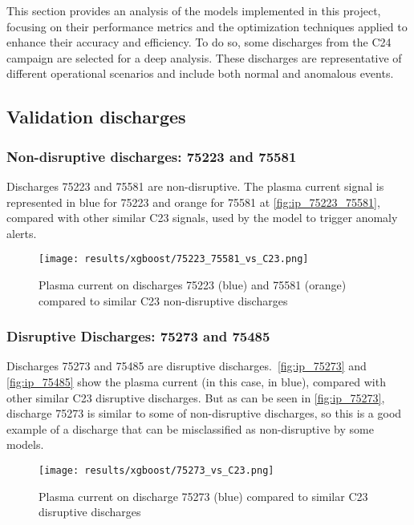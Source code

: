 This section provides an analysis of the models implemented in this project, focusing on their performance metrics and the optimization techniques applied to enhance their accuracy and efficiency. To do so, some discharges from the C24 campaign are selected for a deep analysis. These discharges are representative of different operational scenarios and include both normal and anomalous events.

\subsection{Validation discharges}

\subsubsection{Non-disruptive discharges: 75223 and 75581}

Discharges 75223 and 75581 are non-disruptive. The plasma current signal is represented in blue for 75223 and orange for 75581 at \autoref{fig:ip_75223_75581}, compared with other similar C23 signals, used by the model to trigger anomaly alerts.

\begin{figure}[H]
    \centering
    \texttt{[image: results/xgboost/75223\_75581\_vs\_C23.png]}
    \caption{Plasma current on discharges 75223 (blue) and 75581 (orange) compared to similar C23 non-disruptive discharges}
    \label{fig:ip_75223_75581}
\end{figure}

\subsubsection{Disruptive Discharges: 75273 and 75485}

Discharges 75273 and 75485 are disruptive discharges.\ \autoref{fig:ip_75273} and \autoref{fig:ip_75485} show the plasma current (in this case, in blue), compared with other similar C23 disruptive discharges. But as can be seen in \autoref{fig:ip_75273}, discharge 75273 is similar to some of non-disruptive discharges, so this is a good example of a discharge that can be misclassified as non-disruptive by some models.

\begin{figure}[H]
    \centering
    \texttt{[image: results/xgboost/75273\_vs\_C23.png]}
    \caption{Plasma current on discharge 75273 (blue) compared to similar C23 disruptive discharges}
    \label{fig:ip_75273}
\end{figure}

